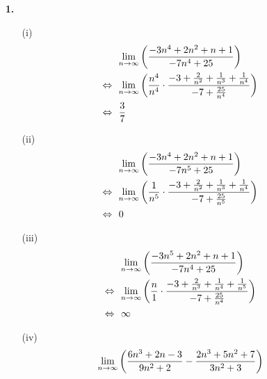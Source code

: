 \documentclass [a4paper,12pt]{article}
\author{\authorinfotitle}
\title{\titleinfo}
\date{\today}
\begin{document}
\maketitle
    \begin{enumerate}
        \item[\textbf{1.}]
            \begin{enumerate}
                \item[(i)]
                    \begin{align*}
                        &\underset{n \to \infty}{\lim}
                        \left( \frac{-3n^4+2n^2+n+1}{-7n^4+25} \right) \\
                        \Leftrightarrow \ \ &\underset{n \to \infty}{\lim}
                        \left( \frac{n^4}{n^4} \cdot \frac{-3+ \frac{2}{n^2} + \frac{1}{n^3} + \frac{1}{n^4}}{-7+ \frac{25}{n^4}} \right) \\
                        \Leftrightarrow \ \ &\frac{3}{7}
                    \end{align*}
                \item[(ii)]
                    \begin{align*}
                        &\limp
                        \left( \frac{-3n^4+2n^2+n+1}{-7n^5+25} \right) \\
                        \Leftrightarrow \  \ &\limp
                        \left( \frac{1}{n^5} \cdot \frac{-3+ \frac{2}{n^2} + \frac{1}{n^3} + \frac{1}{n^4}}{-7+ \frac{25}{n^5}} \right) \\
                        \Leftrightarrow \ \ &0 %
                    \end{align*}
                \item[(iii)]
                    \begin{align*}
                        &\underset{n \to \infty}{\lim}
                        \left( \frac{-3n^5+2n^2+n+1}{-7n^4+25} \right) \\
                        \Leftrightarrow \ \ & \underset{n \to \infty}{\lim}
                        \left( \frac{n}{1} \cdot \frac{-3+ \frac{2}{n^3} + \frac{1}{n^4} + \frac{1}{n^5}}{-7+ \frac{25}{n^4}} \right) \\
                        \Leftrightarrow \ \ &\infty
                    \end{align*}
                \item[(iv)]
                    \begin{align*}
                        &\limp
                        \left( \frac{6n^3+2n-3}{9n^2+2} - \frac{2n^3+5n^2+7}{3n^2+3} \right) \\

\end{align*}
\end{enumerate}
\end{enumerate}
\end{document}
